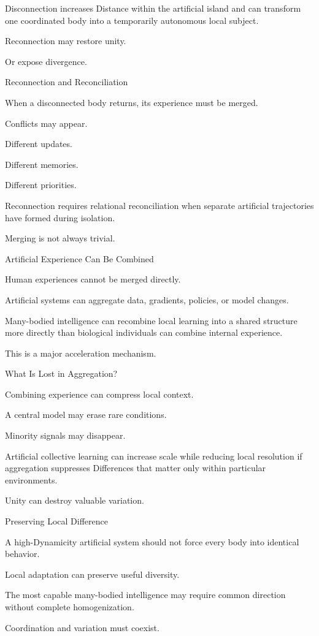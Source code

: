 Disconnection increases Distance within the artificial island and can transform one coordinated body into a temporarily autonomous local subject.

Reconnection may restore unity.

Or expose divergence.

Reconnection and Reconciliation

When a disconnected body returns, its experience must be merged.

Conflicts may appear.

Different updates.

Different memories.

Different priorities.

Reconnection requires relational reconciliation when separate artificial trajectories have formed during isolation.

Merging is not always trivial.

Artificial Experience Can Be Combined

Human experiences cannot be merged directly.

Artificial systems can aggregate data, gradients, policies, or model changes.

Many-bodied intelligence can recombine local learning into a shared structure more directly than biological individuals can combine internal experience.

This is a major acceleration mechanism.

What Is Lost in Aggregation?

Combining experience can compress local context.

A central model may erase rare conditions.

Minority signals may disappear.

Artificial collective learning can increase scale while reducing local resolution if aggregation suppresses Differences that matter only within particular environments.

Unity can destroy valuable variation.

Preserving Local Difference

A high-Dynamicity artificial system should not force every body into identical behavior.

Local adaptation can preserve useful diversity.

The most capable many-bodied intelligence may require common direction without complete homogenization.

Coordination and variation must coexist.


